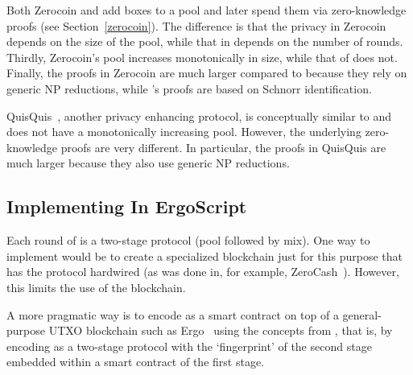 \documentclass[runningheads]{llncs}
\newcommand{\langname}{ErgoScript\xspace}
\newcommand{\zerocoin}{Zerocoin\xspace}
\begin{document}

Both \zerocoin and \algname add boxes to a pool and later spend them via zero-knowledge proofs (see Section~\ref{zerocoin}). 
The difference is that the privacy in \zerocoin depends on the size of the pool, while that in \algname depends on the number of rounds. Thirdly, \zerocoin's pool increases monotonically in size, while that of \algname does not. Finally, the proofs in \zerocoin are much larger compared to \algname because they rely on generic NP reductions, while \algname's proofs are based on Schnorr identification. 

QuisQuis~\cite{quisquis}, another privacy enhancing protocol, is conceptually similar to \algname 
and does not have a monotonically increasing pool. 
However, the underlying zero-knowledge proofs are very different. In particular, the proofs in QuisQuis are much larger because they also use generic NP reductions. 



\subsection{Implementing \algname In \langname}
\label{impl}
Each round of \algname is a two-stage protocol (pool followed by mix). One way to implement \algname would be to create a specialized blockchain just for this purpose that has the protocol hardwired (as was done in, for example, ZeroCash~\cite{zcash}). However, this limits the use of the blockchain. 

A more pragmatic way is to encode \algname as a smart contract on top of a general-purpose UTXO blockchain such as Ergo~\cite{ergo} using the concepts from \cite{multistage}, that is, by encoding \algname as a two-stage protocol with the `fingerprint' of the second stage embedded within a smart contract of the first stage.
\end{document}
